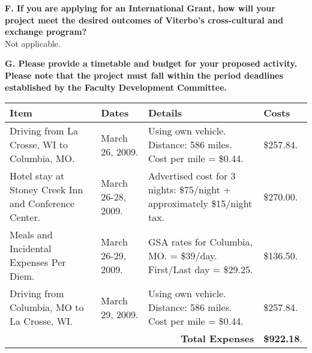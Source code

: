 \documentclass[12pt]{article}
\begin{document}
\textbf{F. If you are applying for an International Grant, how will your project meet the desired outcomes of Viterbo's cross-cultural and exchange program?} \\
Not applicable.\\

\newpage

\textbf{G. Please provide a timetable and budget for your proposed activity.  Please note that the project must fall within the period deadlines established by the Faculty Development Committee.}\\

\begin{tabular}{p{1.9in}|p{1.4in}|p{1.9in}|p{0.6in}}
\textbf{Item} & \textbf{Dates} & \textbf{Details} &\textbf{Costs} \\ \hline
Driving from La Crosse, WI to Columbia, MO. & March 26, 2009. & Using own vehicle. Distance: 586 miles.  Cost per mile = \$0.44. & \$257.84. \\ \hline
Hotel stay at Stoney Creek Inn and Conference Center. & March 26-28, 2009. & Advertised cost for 3 nights: \$75/night + approximately \$15/night tax. & \$270.00. \\ \hline
Meals and Incidental Expenses Per Diem. & March 26-29, 2009. & GSA rates for Columbia, MO. = \$39/day.  First/Last day = \$29.25. & \$136.50. \\ \hline 
Driving from Columbia, MO to La Crosse, WI. & March 29, 2009. & Using own vehicle. Distance: 586 miles.  Cost per mile = \$0.44. & \$257.84. \\ \hline
\multicolumn{3}{r|}{\textbf{Total Expenses}} & \textbf{\$922.18}. \\
\end{tabular}
\end{document}
